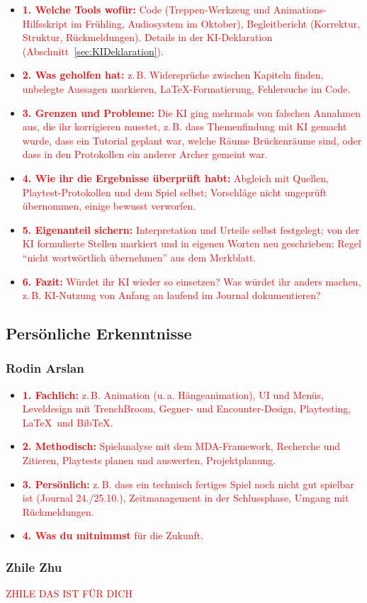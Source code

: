 \documentclass[../Main.tex]{subfiles}
\begin{document}
\begin{itemize}[leftmargin=1.5cm]
    \item \textcolor{red}{\textbf{1. Welche Tools wofür:} Code (Treppen-Werkzeug und Animations-Hilfsskript im Frühling, Audiosystem im Oktober), Begleitbericht (Korrektur, Struktur, Rückmeldungen). Details in der KI-Deklaration (Abschnitt~\ref{sec:KIDeklaration}).}
    \item \textcolor{red}{\textbf{2. Was geholfen hat:} z.\,B. Widersprüche zwischen Kapiteln finden, unbelegte Aussagen markieren, \LaTeX-Formatierung, Fehlersuche im Code.}
    \item \textcolor{red}{\textbf{3. Grenzen und Probleme:} Die KI ging mehrmals von falschen Annahmen aus, die ihr korrigieren musstet, z.\,B. dass Themenfindung mit KI gemacht wurde, dass ein Tutorial geplant war, welche Räume Brückenräume sind, oder dass in den Protokollen ein anderer Archer gemeint war.}
    \item \textcolor{red}{\textbf{4. Wie ihr die Ergebnisse überprüft habt:} Abgleich mit Quellen, Playtest-Protokollen und dem Spiel selbst; Vorschläge nicht ungeprüft übernommen, einige bewusst verworfen.}
    \item \textcolor{red}{\textbf{5. Eigenanteil sichern:} Interpretation und Urteile selbst festgelegt; von der KI formulierte Stellen markiert und in eigenen Worten neu geschrieben; Regel \enquote{nicht wortwörtlich übernehmen} aus dem Merkblatt.}
    \item \textcolor{red}{\textbf{6. Fazit:} Würdet ihr KI wieder so einsetzen? Was würdet ihr anders machen, z.\,B. KI-Nutzung von Anfang an laufend im Journal dokumentieren?}
\end{itemize}

\subsection{Persönliche Erkenntnisse}

\subsubsection{Rodin Arslan}

\begin{itemize}[leftmargin=1.5cm]
    \item \textcolor{red}{\textbf{1. Fachlich:} z.\,B. Animation (u.\,a. Hängeanimation), UI und Menüs, Leveldesign mit TrenchBroom, Gegner- und Encounter-Design, Playtesting, \LaTeX\ und BibTeX.}
    \item \textcolor{red}{\textbf{2. Methodisch:} Spielanalyse mit dem MDA-Framework, Recherche und Zitieren, Playtests planen und auswerten, Projektplanung.}
    \item \textcolor{red}{\textbf{3. Persönlich:} z.\,B. dass ein technisch fertiges Spiel noch nicht gut spielbar ist (Journal 24./25.10.), Zeitmanagement in der Schlussphase, Umgang mit Rückmeldungen.}
    \item \textcolor{red}{\textbf{4. Was du mitnimmst} für die Zukunft.}
\end{itemize}

\subsubsection{Zhile Zhu}

\textcolor{red}{ZHILE DAS IST FÜR DICH}
\end{document}
